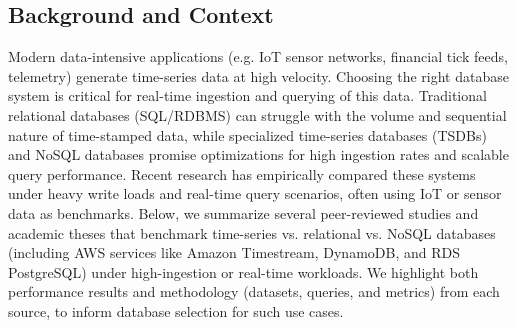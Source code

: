 \documentclass[11pt]{article}
\begin{document}
\subsection*{Background and Context}
Modern data-intensive applications (e.g. IoT sensor networks, financial tick feeds, telemetry) generate time-series data at high velocity. Choosing the right database system is critical for real-time ingestion and querying of this data. Traditional relational databases (SQL/RDBMS) can struggle with the volume and sequential nature of time-stamped data, while specialized time-series databases (TSDBs) and NoSQL databases promise optimizations for high ingestion rates and scalable query performance. Recent research has empirically compared these systems under heavy write loads and real-time query scenarios, often using IoT or sensor data as benchmarks. Below, we summarize several peer-reviewed studies and academic theses that benchmark time-series vs. relational vs. NoSQL databases (including AWS services like Amazon Timestream, DynamoDB, and RDS PostgreSQL) under high-ingestion or real-time workloads. We highlight both performance results and methodology (datasets, queries, and metrics) from each source, to inform database selection for such use cases.
\end{document}
